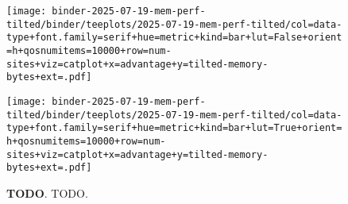 \begin{figure*}

\texttt{[image: binder-2025-07-19-mem-perf-tilted/binder/teeplots/2025-07-19-mem-perf-tilted/col=data-type+font.family=serif+hue=metric+kind=bar+lut=False+orient=h+qosnumitems=10000+row=num-sites+viz=catplot+x=advantage+y=tilted-memory-bytes+ext=.pdf]}
\label{fig:mem-perf-tilted:nolut}

\texttt{[image: binder-2025-07-19-mem-perf-tilted/binder/teeplots/2025-07-19-mem-perf-tilted/col=data-type+font.family=serif+hue=metric+kind=bar+lut=True+orient=h+qosnumitems=10000+row=num-sites+viz=catplot+x=advantage+y=tilted-memory-bytes+ext=.pdf]}
\label{fig:mem-perf-tilted:lut}

\caption{
\textbf{TODO}.
\footnotesize
TODO.
}
\label{fig:mem-perf-tilted}

\end{figure*}
